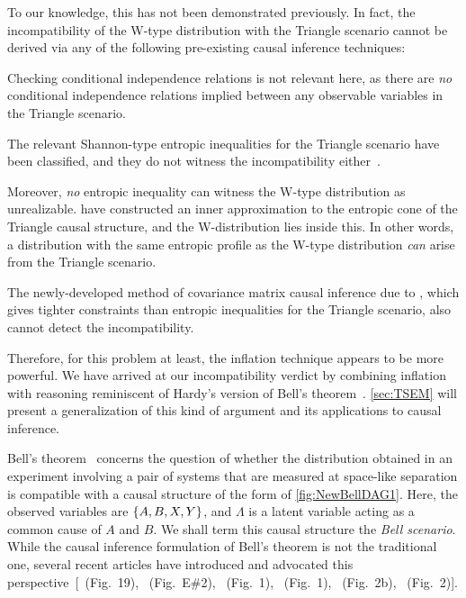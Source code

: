 To our knowledge, this has not been demonstrated previously. In fact, the incompatibility of the W-type distribution with the Triangle scenario cannot be derived via any of the following pre-existing causal inference techniques:
\begin{compactenum}
\item Checking conditional independence relations is not relevant here, as there are \emph{no} conditional independence relations implied between any observable variables in the Triangle scenario. 
\item The relevant Shannon-type entropic inequalities for the Triangle scenario have been classified, and they do not witness the incompatibility either~\cite{fritz2013marginal,chaves2014novel,chaves2014informationinference}. 
\item Moreover, \emph{no} entropic inequality can witness the W-type distribution as unrealizable. \citet{weilenmann2016entropic} have constructed an inner approximation to the entropic cone of the Triangle causal structure, and the W-distribution lies inside this. In other words, a distribution with the same entropic profile as the W-type distribution \emph{can} arise from the Triangle scenario.
\item The newly-developed method of covariance matrix causal inference due to \citet{kela2016covariance}, which gives tighter constraints than entropic inequalities for the Triangle scenario, also cannot detect the incompatibility.
\end{compactenum}
Therefore, for this problem at least, the inflation technique appears to be more powerful. We have arrived at our incompatibility verdict by combining inflation with reasoning reminiscent of  Hardy's version of Bell's theorem~\cite{L.Hardy:PRL:1665,Mansfield2012}. \cref{sec:TSEM} will present a generalization of this kind of argument and its applications to causal inference. 

\par\smallskip\nobreak

Bell's theorem~\cite{bell1964einstein,Brunner2013Bell,bell1966lhvm,CHSHOriginal} concerns the question of whether the distribution obtained in an experiment involving a pair of systems that are measured at space-like separation is compatible with a causal structure of the form of \cref{fig:NewBellDAG1}. Here, the observed variables are $\left\lbrace A,B,X,Y\right\rbrace$, and $\Lambda$ is a latent variable acting as a common cause of $A$ and $B$. We shall term this causal structure the \emph{Bell scenario}. While the causal inference formulation of Bell's theorem is not the traditional one, several recent articles have introduced and advocated this perspective~[\citealp{WoodSpekkens}~(Fig.~19), \citealp{pusey2014gdag}~(Fig.~E\#2), \citealp{BeyondBellII}~(Fig.~1), \citealp{chaves2014novel}~(Fig.~1), \citealp{wolfe2015nonconvexity}~(Fig.~2b), \citealp{steeg2011relaxation}~(Fig.~2)].  

